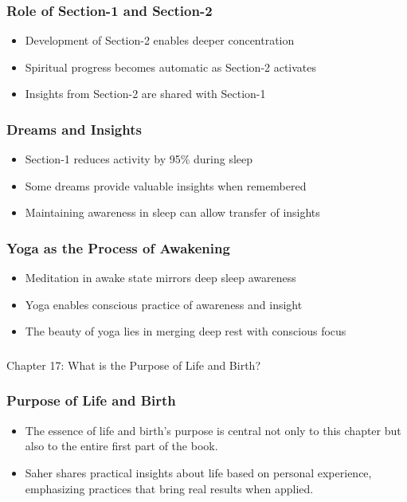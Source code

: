 \begin{frame}[fragile]\frametitle{Role of Section-1 and Section-2}
    \begin{itemize}
        \item Development of Section-2 enables deeper concentration
        \item Spiritual progress becomes automatic as Section-2 activates
        \item Insights from Section-2 are shared with Section-1
    \end{itemize}
\end{frame}

\begin{frame}[fragile]\frametitle{Dreams and Insights}
    \begin{itemize}
        \item Section-1 reduces activity by 95\% during sleep
        \item Some dreams provide valuable insights when remembered
        \item Maintaining awareness in sleep can allow transfer of insights
    \end{itemize}
\end{frame}

\begin{frame}[fragile]\frametitle{Yoga as the Process of Awakening}
    \begin{itemize}
        \item Meditation in awake state mirrors deep sleep awareness
        \item Yoga enables conscious practice of awareness and insight
        \item The beauty of yoga lies in merging deep rest with conscious focus
    \end{itemize}
\end{frame}


\begin{frame}[fragile]\frametitle{}
\begin{center}
{\Large Chapter 17: What is the Purpose of Life and Birth?}
\end{center}
\end{frame}

\begin{frame}[fragile]\frametitle{Purpose of Life and Birth}
    \begin{itemize}
        \item The essence of life and birth's purpose is central not only to this chapter but also to the entire first part of the book.
        \item Saher shares practical insights about life based on personal experience, emphasizing practices that bring real results when applied.
    \end{itemize}
\end{frame}

